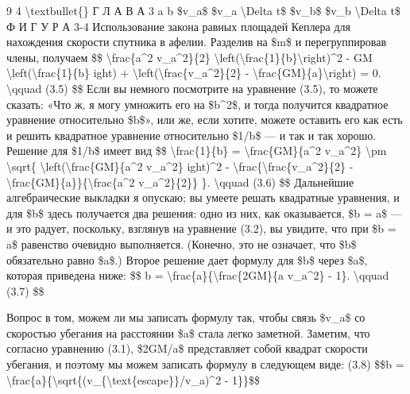 \documentclass[10pt,oneside]{article}
\newcommand{\TipsRunning}[1]{\par\vspace{2bp}{\centering\footnotesize #1\par}\vspace{2bp}}
\begin{document}
9 4 \textbackslash{}textbullet\{\} Г Л А В А  3 a b \$v\_a\$ \$v\_a \textbackslash{}Delta t\$ \$v\_b\$ \$v\_b \textbackslash{}Delta t\$ Ф И Г У Р А  3-4 Использование закона равных площадей Кеплера для нахождения скорости спутника в афелии. Разделив на \$m\$ и перегруппировав члены, получаем \$\$ \textbackslash{}frac\{a\textasciicircum{}2 v\_a\textasciicircum{}2\}\{2\} \textbackslash{}left(\textbackslash{}frac\{1\}\{b\}\textbackslash{}right)\textasciicircum{}2 - GM \textbackslash{}left(\textbackslash{}frac\{1\}\{b\} ight) + \textbackslash{}left(\textbackslash{}frac\{v\_a\textasciicircum{}2\}\{2\} - \textbackslash{}frac\{GM\}\{a\}\textbackslash{}right) = 0. \textbackslash{}qquad (3.5) \$\$ Если вы немного посмотрите на уравнение (3.5), то можете сказать: «Что ж, я могу умножить его на \$b\textasciicircum{}2\$, и тогда получится квадратное уравнение относительно \$b\$», или же, если хотите, можете оставить его как есть и решить квадратное уравнение относительно \$1/b\$ --- и так и так хорошо. Решение для \$1/b\$ имеет вид \$\$ \textbackslash{}frac\{1\}\{b\} = \textbackslash{}frac\{GM\}\{a\textasciicircum{}2 v\_a\textasciicircum{}2\} \textbackslash{}pm \textbackslash{}sqrt\{ \textbackslash{}left(\textbackslash{}frac\{GM\}\{a\textasciicircum{}2 v\_a\textasciicircum{}2\} ight)\textasciicircum{}2 - \textbackslash{}frac\{\textbackslash{}frac\{v\_a\textasciicircum{}2\}\{2\} - \textbackslash{}frac\{GM\}\{a\}\}\{\textbackslash{}frac\{a\textasciicircum{}2 v\_a\textasciicircum{}2\}\{2\}\} \}. \textbackslash{}qquad (3.6) \$\$ Дальнейшие алгебраические выкладки я опускаю; вы умеете решать квадратные уравнения, и для \$b\$ здесь получается два решения: одно из них, как оказывается, \$b = a\$ --- и это радует, поскольку, взглянув на уравнение (3.2), вы увидите, что при \$b = a\$ равенство очевидно выполняется. (Конечно, это не означает, что \$b\$ обязательно равно \$a\$.) Второе решение дает формулу для \$b\$ через \$a\$, которая приведена ниже: \$\$ b = \textbackslash{}frac\{a\}\{\textbackslash{}frac\{2GM\}\{a v\_a\textasciicircum{}2\} - 1\}. \textbackslash{}qquad (3.7) \$\$\par

\TipsRunning{З А Д А Ч И  И  И Х  Р Е Ш Е Н И Я \textbackslash{}textbullet\{\} 9 5}

Вопрос в том, можем ли мы записать формулу так, чтобы связь \$v\_a\$ со скоростью убегания на расстоянии \$a\$ стала легко заметной. Заметим, что согласно уравнению (3.1), \$2GM/a\$ представляет собой квадрат скорости убегания, и поэтому мы можем записать формулу в следующем виде: (3.8) \$\$b = \textbackslash{}frac\{a\}\{\textbackslash{}sqrt\{(v\_\{\textbackslash{}text\{escape\}\}/v\_a)\textasciicircum{}2 - 1\}\}\$\$\par
\end{document}
